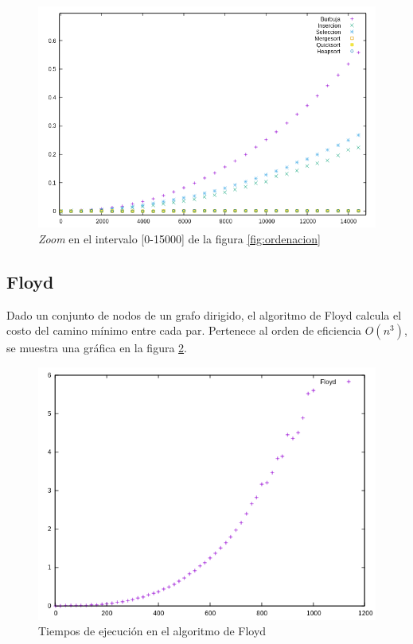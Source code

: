 \documentclass{article}
\begin{document}
	\begin{figure}[H]
		\centering
		\includegraphics[totalheight=8cm]{img/ordenacion_zoom}
		\caption{\textit{Zoom} en el intervalo [0-15000] de la figura \ref{fig:ordenacion}}
		\label{fig:ordenacion_zoom}
	\end{figure}
\subsection{Floyd}
Dado un conjunto de nodos de un grafo dirigido, el algoritmo de Floyd calcula el costo del camino mínimo entre cada par. Pertenece al orden de eficiencia $O(n ^3)$, se muestra una gráfica en la figura \ref{fig:floyd}.
\begin{figure}[H]
	\centering
	\includegraphics[totalheight=8cm]{img/floyd}
	\caption{Tiempos de ejecución en el algoritmo de Floyd}
	\label{fig:floyd}
\end{figure}
\end{document}
